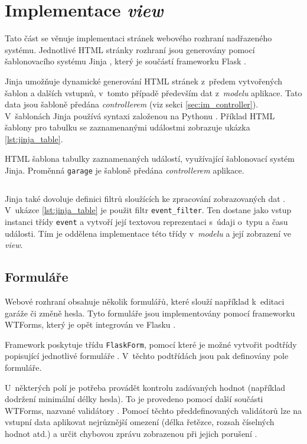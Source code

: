 \section{Implementace \textit{view}}

Tato část se věnuje implementaci stránek webového rozhraní nadřazeného systému. Jednotlivé HTML stránky rozhraní jsou generovány pomocí šablonovacího systému Jinja \cite{jinja}, který je součástí frameworku Flask \cite{flask_templates}. 

Jinja umožňuje dynamické generování HTML stránek z~předem vytvořených šablon a dalších vstupnů, v~tomto případě především dat z~\textit{modelu} aplikace. Tato data jsou šabloně předána \textit{controllerem} (viz sekci \ref{sec:im_controller}). V~šablonách Jinja používá syntaxi založenou na Pythonu \cite{jinja}. Příklad HTML šablony pro tabulku se zaznamenanými událostmi zobrazuje ukázka \ref{lst:jinja_table}.

\begin{listing}[htbp]
\caption{\label{lst:jinja_table} HTML šablona tabulky zaznamenaných událostí, využívající šablonovací systém Jinja. Proměnná \texttt{garage} je šabloně předána \textit{controllerem} aplikace.}
\inputminted[bgcolor=codebg]{html}{source-samples/jinja_table.html}
\end{listing}

Jinja také dovoluje definici filtrů sloužících ke zpracování zobrazovaných dat \cite{jinja}. V~ukázce \ref{lst:jinja_table} je použit filtr \texttt{event\_filter}. Ten dostane jako vstup instanci třídy \texttt{event} a vytvoří její textovou reprezentaci s~údaji o~typu a času události. Tím je oddělena implementace této třídy v~\textit{modelu} a její zobrazení ve \textit{view}.

\subsection{Formuláře}
\label{sec:im_forms}

Webové rozhraní obsahuje několik formulářů, které slouží například k~editaci garáže či změně hesla. Tyto formuláře jsou implementovány pomocí frameworku WTForms, který je opět integrován ve Flasku \cite{flask_wtf}.

Framework poskytuje třídu \texttt{FlaskForm}, pomocí které je možné vytvořit podtřídy popisující jednotlivé formuláře \cite{flask_wtf}. V~těchto podtřídách jsou pak definovány pole formuláře.

U~některých polí je potřeba provádět kontrolu zadávaných hodnot (například dodržení minimální délky hesla). To je provedeno pomocí další součásti WTForms, nazvané validátory \cite{flask_wtf}. Pomocí těchto předdefinovaných validátorů lze na vstupní data aplikovat nejrůznější omezení (délka řetězce, rozsah číselných hodnot atd.) a určit chybovou zprávu zobrazenou při jejich porušení \cite{flask_wtf}.

